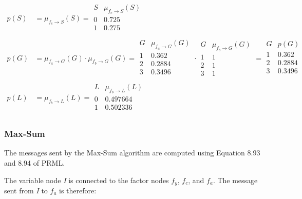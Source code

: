 \documentclass[a4paper, 12pt]{article}
\begin{document}
\begin{align}
	p(S) &= \mu_{f_c \to S}(S) = \begin{array}{c|c}
		S & \mu_{f_c \to S}(S)\\
		\hline
		0 & 0.725\\
		1 & 0.275\\
	\end{array}\\
	p(G) &= \mu_{f_a \to G}(G) \cdot \mu_{f_b \to G}(G) 
	= \begin{array}{c|c}
		G & \mu_{f_a \to G}(G)\\
		\hline
		1 & 0.362\\
		2 & 0.2884\\
		3 & 0.3496\\
	\end{array} \cdot \begin{array}{c|c}
		G & \mu_{f_b \to G}(G)\\
		\hline
		1 & 1\\
		2 & 1\\
		3 & 1
	\end{array} = \begin{array}{c|c}
		G & p(G)\\
		\hline
		1 & 0.362\\
		2 & 0.2884\\
		3 & 0.3496\\
	\end{array}\\
	p(L) &= \mu_{f_b \to L}(L) = \begin{array}{c|c}
		L & \mu_{f_b \to L}(L)\\
		\hline
		0 & 0.497664\\
		1 & 0.502336\\
	\end{array}
\end{align}

\subsubsection{Max-Sum}

The messages sent by the Max-Sum algorithm are computed using Equation 8.93 and 8.94 of PRML.

The variable node \textit{I} is connected to the factor nodes $f_y$, $f_c$, and $f_a$. The message sent from \textit{I} to $f_a$ is therefore:
\end{document}

